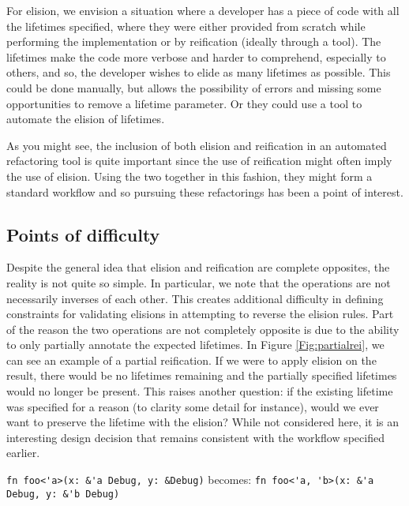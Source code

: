 For elision, we envision a situation where a developer has a piece of code with all the lifetimes specified, where they were either provided from scratch while performing the implementation or by reification (ideally through a tool). The lifetimes make the code more verbose and harder to comprehend, especially to others, and so, the developer wishes to elide as many lifetimes as possible. This could be done manually, but allows the possibility of errors and missing some opportunities to remove a lifetime parameter. Or they could use a tool to automate the elision of lifetimes. 

As you might see, the inclusion of both elision and reification in an automated refactoring tool is quite important since the use of reification might often imply the use of elision. Using the two together in this fashion, they might form a standard workflow and so pursuing these refactorings has been a point of interest.

\subsection{Points of difficulty}\label{S:pod}
Despite the general idea that elision and reification are complete opposites, the reality is not quite so simple. In particular, we note that the operations are not necessarily inverses of each other. This creates additional difficulty in defining constraints for validating elisions in attempting to reverse the elision rules. Part of the reason the two operations are not completely opposite is due to the ability to only partially annotate the expected lifetimes. In Figure \ref{Fig:partialrei}, we can see an example of a partial reification. If we were to apply elision on the result, there would be no lifetimes remaining and the partially specified lifetimes would no longer be present. This raises another question: if the existing lifetime was specified for a reason (to clarity some detail for instance), would we ever want to preserve the lifetime with the elision? While not considered here, it is an interesting design decision that remains consistent with the workflow specified earlier. 

\begin{fig}
{\verb|fn foo<'a>(x: &'a Debug, y: &Debug)|}\newline
becomes: {\verb|fn foo<'a, 'b>(x: &'a Debug, y: &'b Debug)|}
\caption{Partial reification -- \emph{'a} exists, \emph{'b} missing}
\label{Fig:partialrei}
\end{fig}


